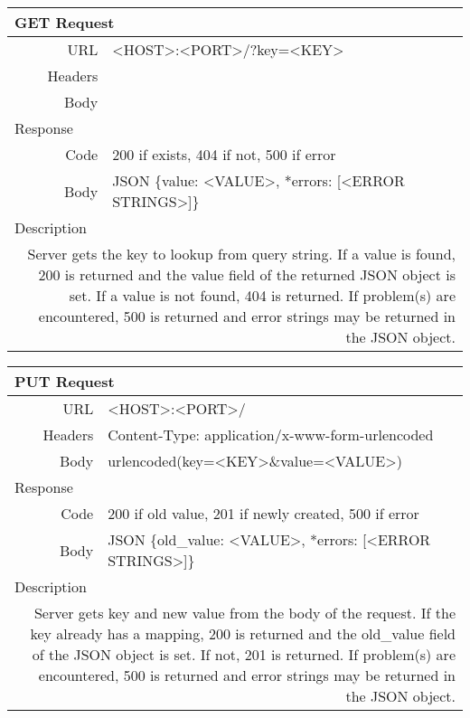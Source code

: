 \begin{table}[h]
  \centering
  \begin{tabular}{|r|l|}
    \hline
    \multicolumn{2}{|l|}{GET Request} \\ \hline
    URL & <HOST>:<PORT>/?key=<KEY> \\
    Headers & \\
    Body & \\ \hline
    \multicolumn{2}{|l|}{Response} \\ \hline
    Code & 200 if exists, 404 if not, 500 if error \\
    Body & JSON \{value: <VALUE>, *errors: [<ERROR STRINGS>]\} \\ \hline
    \multicolumn{2}{|l|}{Description} \\ \hline
    \multicolumn{2}{|p{0.75\textwidth}|}{Server gets the key to lookup from
                         query string. If a value is found, 200 is returned and
                         the value field of the returned JSON object is set. If
                         a value is not found, 404 is returned. If problem(s)
                         are encountered, 500 is returned and error strings may
                         be returned in the JSON object.} \\ \hline
  \end{tabular}
\end{table}

\begin{table}[h]
  \centering
  \begin{tabular}{|r|l|}
    \hline
    \multicolumn{2}{|l|}{PUT Request} \\ \hline
    URL & <HOST>:<PORT>/ \\
    Headers & Content-Type: application/x-www-form-urlencoded \\
    Body & urlencoded(key=<KEY>\&value=<VALUE>) \\ \hline
    \multicolumn{2}{|l|}{Response} \\ \hline
    Code & 200 if old value, 201 if newly created, 500 if error \\
    Body & JSON \{old\_value: <VALUE>, *errors: [<ERROR STRINGS>]\} \\ \hline
    \multicolumn{2}{|l|}{Description} \\ \hline
    \multicolumn{2}{|p{0.75\textwidth}|}{Server gets key and new value from the
                         body of the request. If the key already has a mapping,
                         200 is returned and the old\_value field of the JSON
                         object is set. If not, 201 is returned. If problem(s)
                         are encountered, 500 is returned and error strings may
                         be returned in the JSON object.} \\ \hline
  \end{tabular}
\end{table}

